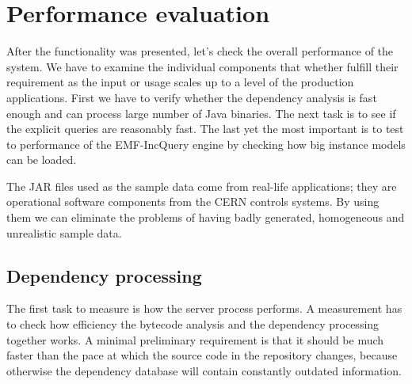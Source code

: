 \chapter{Performance evaluation}

After the functionality was presented, let's check the overall performance of
the system. We have to examine the individual components that whether fulfill their
requirement as the input or usage scales up to a level of the production
applications. First we have to verify whether the dependency analysis is fast
enough and can process large number of Java binaries. The next task is to see if
the explicit queries are reasonably fast. The last yet the most important is to
test to performance of the EMF-IncQuery engine by checking how big instance
models can be loaded.

The JAR files used as the sample data come from real-life applications; they are
operational software components from the CERN controls systems. By using them we
can eliminate the problems of having badly generated, homogeneous and
unrealistic sample data.

\section{Dependency processing}
\label{sect:depproc}
The first task to measure is how the server process performs.
A measurement has to check how efficiency the bytecode analysis and the
dependency processing together works. A minimal preliminary requirement is that
it should be much faster than the pace at which the source code in the
repository changes, because otherwise the dependency database will contain
constantly outdated information.

